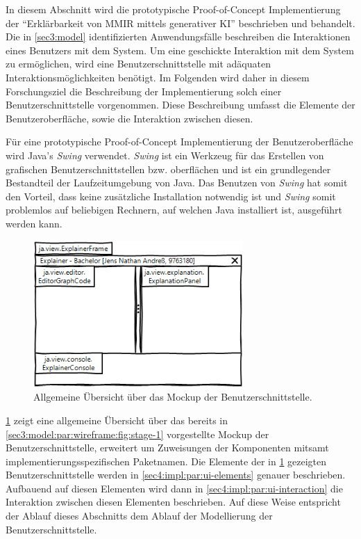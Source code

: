 In diesem Abschnitt wird die prototypische Proof-of-Concept Implementierung der \enquote{Erklärbarkeit von MMIR mittels generativer KI} beschrieben und behandelt.
Die in \cref{sec3:model} identifizierten Anwendungsfälle beschreiben die Interaktionen eines Benutzers mit dem System.
Um eine geschickte Interaktion mit dem System zu ermöglichen, wird eine Benutzerschnittstelle mit adäquaten Interaktionsmöglichkeiten benötigt.
Im Folgenden wird daher in diesem Forschungsziel die Beschreibung der Implementierung solch einer Benutzerschnittstelle vorgenommen.
Diese Beschreibung umfasst die Elemente der Benutzeroberfläche, sowie die Interaktion zwischen diesen.

Für eine prototypische Proof-of-Concept Implementierung der Benutzeroberfläche wird Java's \textit{Swing} verwendet.
\textit{Swing} ist ein Werkzeug für das Erstellen von grafischen Benutzerschnittstellen bzw. oberflächen und ist ein grundlegender Bestandteil der Laufzeitumgebung von Java.
Das Benutzen von \textit{Swing} hat somit den Vorteil, dass keine zusätzliche Installation notwendig ist und \textit{Swing} somit problemlos auf beliebigen Rechnern, auf welchen Java installiert ist, ausgeführt werden kann.
\begin{figure}[!ht]
  \includegraphics[width=8cm]{chapter/chapter_4/wireframe-impl-overview}
  \caption{Allgemeine Übersicht über das Mockup der Benutzerschnittstelle.}
  \label{sec4:impl:subsubsec:ui:fig:wireframe-overview}
\end{figure}
\cref{sec4:impl:subsubsec:ui:fig:wireframe-overview} zeigt eine allgemeine Übersicht über das bereits in \cref{sec3:model:par:wireframe:fig:stage-1} vorgestellte Mockup der Benutzerschnittstelle, erweitert um Zuweisungen der Komponenten mitsamt implementierungsspezifischen Paketnamen.
Die Elemente der in \cref{sec4:impl:subsubsec:ui:fig:wireframe-overview} gezeigten Benutzerschnittstelle werden in \cref{sec4:impl:par:ui-elements} genauer beschrieben.
Aufbauend auf diesen Elementen wird dann in \cref{sec4:impl:par:ui-interaction} die Interaktion zwischen diesen Elementen beschrieben.
Auf diese Weise entspricht der Ablauf dieses Abschnitts dem Ablauf der Modellierung der Benutzerschnittstelle.

